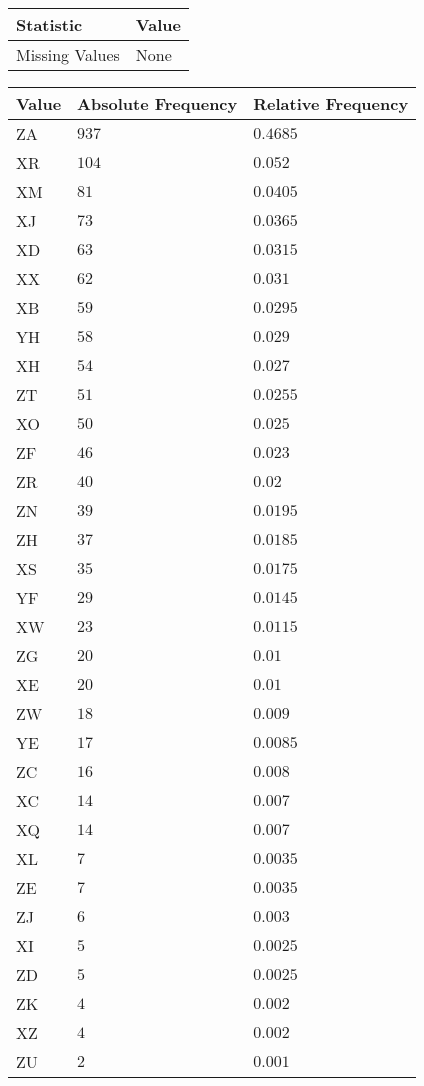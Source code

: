\begin{table}[H]
	\renewcommand{\arraystretch}{1.25}
	\begin{tabular}{l|l}
		\textbf{Statistic} & \textbf{Value}\\\hline
		Missing Values& None\\\hline
	\end{tabular}
\end{table}
\begin{table}[H]
	\renewcommand{\arraystretch}{1.25}
	\begin{tabular}{l|l|l}
		\textbf{Value} & \textbf{Absolute Frequency} & \textbf{Relative Frequency}\\\hline
		ZA&$937$&$0.4685$\\\hline
		XR&$104$&$0.052$\\\hline
		XM&$81$&$0.0405$\\\hline
		XJ&$73$&$0.0365$\\\hline
		XD&$63$&$0.0315$\\\hline
		XX&$62$&$0.031$\\\hline
		XB&$59$&$0.0295$\\\hline
		YH&$58$&$0.029$\\\hline
		XH&$54$&$0.027$\\\hline
		ZT&$51$&$0.0255$\\\hline
		XO&$50$&$0.025$\\\hline
		ZF&$46$&$0.023$\\\hline
		ZR&$40$&$0.02$\\\hline
		ZN&$39$&$0.0195$\\\hline
		ZH&$37$&$0.0185$\\\hline
		XS&$35$&$0.0175$\\\hline
		YF&$29$&$0.0145$\\\hline
		XW&$23$&$0.0115$\\\hline
		ZG&$20$&$0.01$\\\hline
		XE&$20$&$0.01$\\\hline
		ZW&$18$&$0.009$\\\hline
		YE&$17$&$0.0085$\\\hline
		ZC&$16$&$0.008$\\\hline
		XC&$14$&$0.007$\\\hline
		XQ&$14$&$0.007$\\\hline
		XL&$7$&$0.0035$\\\hline
		ZE&$7$&$0.0035$\\\hline
		ZJ&$6$&$0.003$\\\hline
		XI&$5$&$0.0025$\\\hline
		ZD&$5$&$0.0025$\\\hline
		ZK&$4$&$0.002$\\\hline
		XZ&$4$&$0.002$\\\hline
		ZU&$2$&$0.001$
	\end{tabular}
\end{table}

